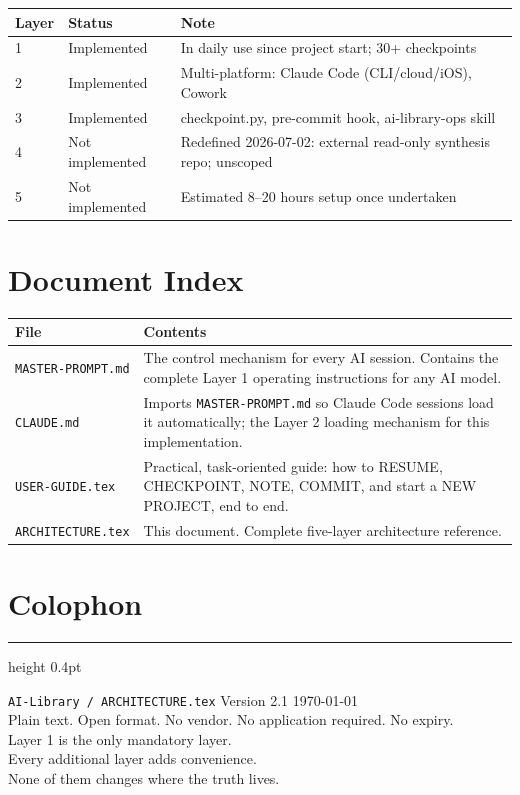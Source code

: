 \documentclass[12pt,letterpaper]{article}
\begin{document}
\begin{center}
\begin{tabular}{@{}llp{6.5cm}@{}}
\toprule
\textbf{Layer} & \textbf{Status} & \textbf{Note} \\
\midrule
1 & Implemented & In daily use since project start; 30+ checkpoints \\
2 & Implemented & Multi-platform: Claude Code (CLI/cloud/iOS), Cowork \\
3 & Implemented & checkpoint.py, pre-commit hook, ai-library-ops skill \\
4 & Not implemented & Redefined 2026-07-02: external read-only synthesis repo; unscoped \\
5 & Not implemented & Estimated 8--20 hours setup once undertaken \\
\bottomrule
\end{tabular}
\end{center}

\section{Document Index}

\begin{center}
\begin{tabular}{@{}lp{9cm}@{}}
\toprule
\textbf{File} & \textbf{Contents} \\
\midrule
\texttt{MASTER-PROMPT.md} &
The control mechanism for every AI session. Contains the complete
Layer 1 operating instructions for any AI model. \\
\texttt{CLAUDE.md} &
Imports \texttt{MASTER-PROMPT.md} so Claude Code sessions load it
automatically; the Layer 2 loading mechanism for this implementation. \\
\texttt{USER-GUIDE.tex} &
Practical, task-oriented guide: how to RESUME, CHECKPOINT, NOTE,
COMMIT, and start a NEW PROJECT, end to end. \\
\texttt{ARCHITECTURE.tex} &
This document. Complete five-layer architecture reference. \\
\bottomrule
\end{tabular}
\end{center}

\section*{Colophon}

\vspace{8pt}
\hrule height 0.4pt
\vspace{12pt}

\begin{center}
{\small\texttt{AI-Library / ARCHITECTURE.tex} \quad Version 2.1 \quad \today}\\[6pt]
{\small Plain text. Open format. No vendor. No application required. No expiry.}\\[4pt]
{\footnotesize
Layer 1 is the only mandatory layer.\\
Every additional layer adds convenience.\\
None of them changes where the truth lives.
}
\end{center}
\end{document}
